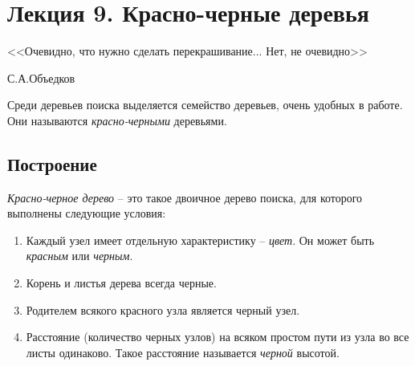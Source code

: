 \documentclass[../main.tex]{subfiles}
\begin{document}
	\section{Лекция 9. Красно-черные деревья}
	\epigraph{
		<<Очевидно, что нужно сделать перекрашивание... Нет, не очевидно>>
	}{
		С.А.Объедков
	}

	Среди деревьев поиска выделяется семейство деревьев, очень удобных в работе. Они называются \textit{красно-черными} деревьями.
	
	\subsection{Построение}
	\begin{definition}
		\textit{Красно-черное дерево} -- это такое двоичное дерево поиска, для которого выполнены следующие условия:
		\begin{enumerate}
			\item Каждый узел имеет отдельную характеристику -- \textit{цвет}. Он может быть \textit{красным} или \textit{черным}.
			\item Корень и листья дерева всегда черные.
			\item Родителем всякого красного узла является черный узел.
			\item Расстояние (количество черных узлов) на всяком простом пути из узла во все листы одинаково. Такое расстояние называется \textit{черной} высотой.
		\end{enumerate}
	\end{definition}
	
\end{document}
